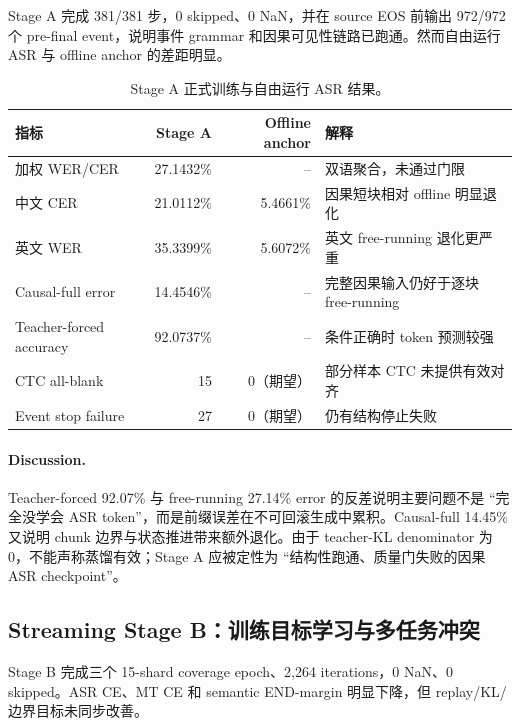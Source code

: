\documentclass[11pt,a4paper]{article}
\begin{document}
Stage A 完成 381/381 步，0 skipped、0 NaN，并在 source EOS 前输出 972/972 个 pre-final event，说明事件 grammar 和因果可见性链路已跑通。然而自由运行 ASR 与 offline anchor 的差距明显。

\begin{table}[H]
\centering
\caption{Stage A 正式训练与自由运行 ASR 结果。}
\label{tab:stagea}
\begin{tabularx}{\textwidth}{lrrY}
\toprule
指标 & Stage A & Offline anchor & 解释 \\
\midrule
加权 WER/CER & 27.1432\% & -- & 双语聚合，未通过门限 \\
中文 CER & 21.0112\% & 5.4661\% & 因果短块相对 offline 明显退化 \\
英文 WER & 35.3399\% & 5.6072\% & 英文 free-running 退化更严重 \\
Causal-full error & 14.4546\% & -- & 完整因果输入仍好于逐块 free-running \\
Teacher-forced accuracy & 92.0737\% & -- & 条件正确时 token 预测较强 \\
CTC all-blank & 15 & 0（期望） & 部分样本 CTC 未提供有效对齐 \\
Event stop failure & 27 & 0（期望） & 仍有结构停止失败 \\
\bottomrule
\end{tabularx}
\end{table}

\paragraph{Discussion.}
Teacher-forced 92.07\% 与 free-running 27.14\% error 的反差说明主要问题不是 ``完全没学会 ASR token''，而是前缀误差在不可回滚生成中累积。Causal-full 14.45\% 又说明 chunk 边界与状态推进带来额外退化。由于 teacher-KL denominator 为 0，不能声称蒸馏有效；Stage A 应被定性为 ``结构性跑通、质量门失败的因果 ASR checkpoint''。

\subsection{Streaming Stage B：训练目标学习与多任务冲突}

Stage B 完成三个 15-shard coverage epoch、2,264 iterations，0 NaN、0 skipped。ASR CE、MT CE 和 semantic END-margin 明显下降，但 replay/KL/边界目标未同步改善。
\end{document}

